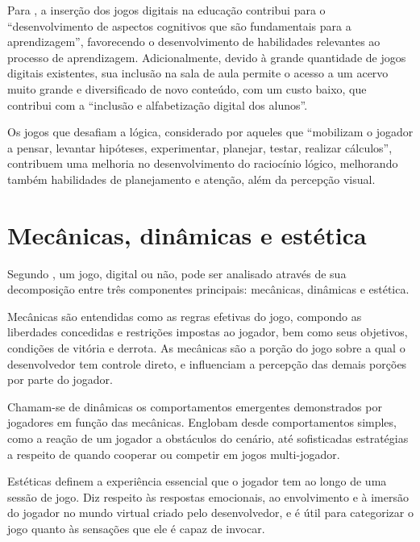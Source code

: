Para \cite{ramos:2013:jogos}, a inserção dos jogos digitais na educação 
contribui para o ``desenvolvimento de aspectos cognitivos que são fundamentais 
para a aprendizagem'', favorecendo o desenvolvimento de habilidades 
relevantes ao processo de aprendizagem. Adicionalmente, devido à 
grande quantidade de jogos digitais existentes, sua inclusão na sala 
de aula permite o acesso a um acervo muito grande e diversificado de 
novo conteúdo, com um custo baixo, que contribui com a ``inclusão e 
alfabetização digital dos alunos''. 

Os jogos que desafiam a lógica, considerado por \cite{ramos:2013:jogos} 
aqueles que ``mobilizam o jogador a pensar, levantar hipóteses, 
experimentar, planejar, testar, realizar cálculos'', contribuem uma
melhoria no desenvolvimento do raciocínio lógico, melhorando 
também habilidades de planejamento e atenção, além da percepção visual. 

\section{Mecânicas, dinâmicas e estética}\label{sec-mecanica-dinamica-estetica}

Segundo \cite{hunicke:2004}, um jogo, digital ou não, pode ser analisado através de
sua decomposição entre três componentes principais: mecânicas, dinâmicas e estética.

Mecânicas são entendidas como as regras efetivas do jogo, compondo as liberdades
concedidas e restrições impostas ao jogador, bem como seus objetivos, condições de
vitória e derrota. As mecânicas são a porção do jogo sobre a qual o desenvolvedor tem
controle direto, e influenciam a percepção das demais porções por parte do jogador.

Chamam-se de dinâmicas os comportamentos emergentes demonstrados por jogadores em 
função das mecânicas. Englobam desde comportamentos simples, como a reação de um
jogador a obstáculos do cenário, até sofisticadas estratégias a respeito de quando
cooperar ou competir em jogos multi-jogador.

Estéticas definem a experiência essencial que o jogador tem ao longo de uma sessão de
jogo. Diz respeito às respostas emocionais, ao envolvimento e à imersão do jogador no
mundo virtual criado pelo desenvolvedor, e é útil para categorizar o jogo quanto às
sensações que ele é capaz de invocar.


